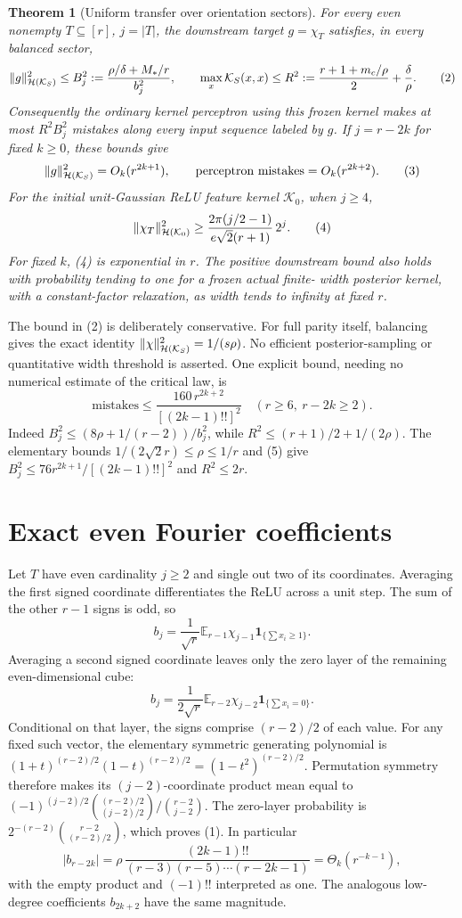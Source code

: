 \documentclass[11pt]{article}
\newtheorem{theorem}{Theorem}\newtheorem{lemma}[theorem]{Lemma}
\newcommand{\E}{\mathbb E}\newcommand{\R}{\mathbb R}
\begin{document}
\begin{theorem}[Uniform transfer over orientation sectors]
For every even nonempty $T\subseteq[r]$, $j=|T|$, the downstream target
$g=\chi_T$ satisfies, in every balanced sector,
\[
 \|g\|_{\mathcal H(\mathcal K_S)}^2
 \le B_j^2:=\frac{\rho/\delta+M_*/r}{b_j^2},\qquad
 \max_x\mathcal K_S(x,x)
 \le R^2:=\frac{r+1+m_c/\rho}{2}+\frac\delta\rho.           \tag{2}
\]
Consequently the ordinary kernel perceptron using this frozen kernel
makes at most $R^2B_j^2$ mistakes along every input sequence labeled by
$g$. If $j=r-2k$ for fixed $k\ge0$, these bounds give
\[
 \|g\|_{\mathcal H(\mathcal K_S)}^2=O_k(r^{2k+1}),\qquad
          \text{perceptron mistakes}=O_k(r^{2k+2}).        \tag{3}
\]
For the initial unit-Gaussian ReLU feature kernel $\mathcal K_0$, when
$j\ge4$,
\[
 \|\chi_T\|_{\mathcal H(\mathcal K_0)}^2
 \ge \frac{2\pi(j/2-1)}{e\sqrt2(r+1)}\,2^j.              \tag{4}
\]
For fixed $k$, (4) is exponential in $r$. The positive downstream bound
also holds with probability tending to one for a frozen actual finite-
width posterior kernel, with a constant-factor relaxation, as width
tends to infinity at fixed $r$.
\end{theorem}
The bound in (2) is deliberately conservative. For full parity itself,
balancing gives the exact identity
$\|\chi\|_{\mathcal H(\mathcal K_S)}^2=1/(s\rho)$.
No efficient posterior-sampling or quantitative width threshold is asserted.
One explicit bound, needing no numerical estimate of the critical law,
is
\[
 \text{mistakes}\le
   \frac{160\,r^{2k+2}}{[(2k-1)!!]^2}
 \quad(r\ge6,\ r-2k\ge2).
\]
Indeed $B_j^2\le(8\rho+1/(r-2))/b_j^2$, while
$R^2\le(r+1)/2+1/(2\rho)$. The elementary bounds
$1/(2\sqrt2r)\le\rho\le1/r$ and (5) give
$B_j^2\le76r^{2k+1}/[(2k-1)!!]^2$ and $R^2\le2r$.

\section{Exact even Fourier coefficients}
Let $T$ have even cardinality $j\ge2$ and single out two of its coordinates.
Averaging the first signed coordinate differentiates the ReLU across a
unit step. The sum of the other $r-1$ signs is odd, so
\[
 b_j=\frac1{\sqrt r}\E_{r-1}
       \chi_{j-1}\mathbf1_{\{\sum x_i\ge1\}}.
\]
Averaging a second signed coordinate leaves only the zero layer of the
remaining even-dimensional cube:
\[
 b_j=\frac1{2\sqrt r}\E_{r-2}
                    \chi_{j-2}\mathbf1_{\{\sum x_i=0\}}.
\]
Conditional on that layer, the signs comprise $(r-2)/2$ of each value.
For any fixed such vector, the elementary symmetric generating polynomial
is $(1+t)^{(r-2)/2}(1-t)^{(r-2)/2}=(1-t^2)^{(r-2)/2}$.
Permutation symmetry therefore makes its $(j-2)$-coordinate product
mean equal to
$(-1)^{(j-2)/2}\binom{(r-2)/2}{(j-2)/2}/\binom{r-2}{j-2}$.
The zero-layer probability is $2^{-(r-2)}\binom{r-2}{(r-2)/2}$,
which proves (1). In particular
\[
 |b_{r-2k}|=\rho\,
 \frac{(2k-1)!!}{(r-3)(r-5)\cdots(r-2k-1)}
                      =\Theta_k(r^{-k-1}),               \tag{5}
\]
with the empty product and $(-1)!!$ interpreted as one. The analogous
low-degree coefficients $b_{2k+2}$ have the same magnitude.
\end{document}
